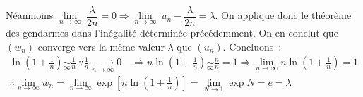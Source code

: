 \documentclass{article}
\begin{document}
  Néanmoins $\underset{n\to\infty}{\lim}\ \dfrac{\lambda}{2n} = 0 \Rightarrow \underset{n\to\infty}{\lim}\ u_n - \dfrac{\lambda}{2n} = \lambda$. On applique donc le théorème des gendarmes dans l'inégalité déterminée précédemment. On en conclut que $(w_n)$ converge vers la même valeur $\lambda$ que $(u_n)$. Concluons~:
  \begin{align*}
    \ln\left(1 + \frac{1}{n}\right) \underset{\infty}{\sim} \frac{1}{n}\ \because \frac{1}{n}\underset{n\to\infty}{\longrightarrow} 0\quad \Longrightarrow n\ln\left(1 + \frac{1}{n}\right) \underset{\infty}{\sim} \frac{n}{n} = 1
    \Longrightarrow \lim_{n\to\infty} n\ln\left(1 + \frac{1}{n}\right) = 1 \\
    \therefore \lim_{n\to\infty} w_n = \lim_{n\to\infty} \exp\left[n\ln\left(1 + \frac{1}{n}\right)\right] = \lim_{N\to 1} \exp N = \boxed{e = \lambda}
  \end{align*}
\end{document}
